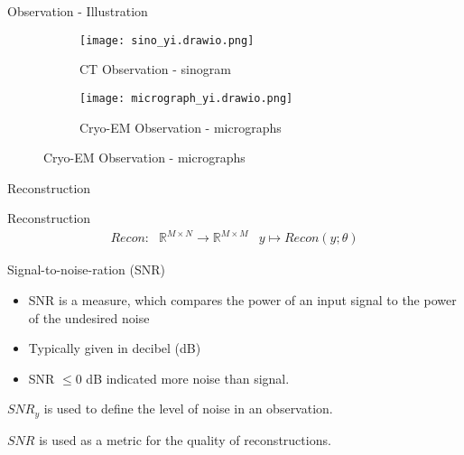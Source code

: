 \begin{frame}{Observation - Illustration }

    \begin{figure}
    \centering
    \begin{subfigure}{0.36\textwidth}
        \texttt{[image: sino\_yi.drawio.png]}
        \caption{CT Observation - sinogram}
    \end{subfigure}
    \begin{subfigure}{0.6\textwidth}
        \texttt{[image: micrograph\_yi.drawio.png]}
        \caption{Cryo-EM Observation - micrographs}
    \end{subfigure}
\end{figure}

\end{frame}


\begin{frame}{Reconstruction}
    \pause
  
    \begin{block}{Reconstruction}
        \begin{equation}
            \begin{aligned}
                \textit{Recon} : & \mathbb{R}^{M \times N} \to \mathbb{R}^{M \times M} & y \mapsto Recon(y; \theta)
            \end{aligned}
        \end{equation}
    \end{block}
\end{frame}



\begin{frame}{Signal-to-noise-ration (SNR)}
    \pause
    \begin{itemize}
        \item SNR is a measure, which compares the power of an input signal to the power of the undesired noise
        \item Typically given in decibel (dB)
        \item SNR $\le 0$ dB indicated more noise than signal. 
    \end{itemize}


    \begin{tcolorbox}[colback=red!5!white,hide=<1-2>, alert=<3>, colframe=red!75!black]
        $SNR_y$ is used to define the level of noise in an observation.
    \end{tcolorbox}

        
    \begin{tcolorbox}[colback=red!5!white,hide=<1-3>, alert=<4>, colframe=red!75!black]
        $SNR$ is used as a metric for the quality of reconstructions.
    \end{tcolorbox}

\end{frame}



